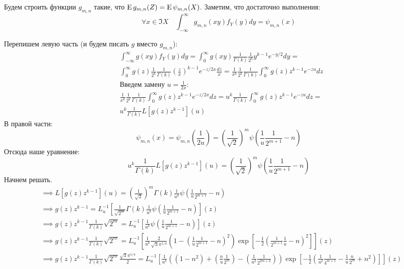 \documentclass[a4paper, fleqn]{report}
\begin{document}
Будем строить функции $g_{m,n}$ такие, что $\operatorname{E} g_{m,n}(Z) = \operatorname{E} \psi_{m,n}(X)$. Заметим, что достаточно выполнения:
\[
    \forall x \in \Im X \quad \int_{-\infty}^{\infty} g_{m,n}(xy)f_Y(y)dy = \psi_{m,n}(x) 
\]

Перепишем левую часть (и будем писать $g$ вместо $g_{m,n}$):
\begin{align*}
    & \int_{-\infty}^{\infty} g(xy) f_Y(y) dy = 
      \int_{0}^{\infty} g(xy) \frac{1}{\Gamma(k)} \frac{1}{2^k} y^{k-1} e^{-y/2} dy = \\
    & \int_{0}^{\infty} g(z) \frac{1}{2^k} \frac{1}{\Gamma(k)} \left( \frac{z}{x} \right)^{k-1} e^{-z / 2x} \frac{dz}{x} =
      \frac{1}{x^k} \frac{1}{2^k} \frac{1}{\Gamma(k)} \int_{0}^{\infty} g(z) z^{k-1} e^{-zu} dz \\
    & \text{Введем замену $u = \frac{1}{2x}$: }\\
    & \frac{1}{x^k} \frac{1}{2^k} \frac{1}{\Gamma(k)} \int_{0}^{\infty} g(z) z^{k-1} e^{-z / 2x} dz =
      u^k \frac{1}{\Gamma(k)} \int_{0}^{\infty} g(z) z^{k-1} e^{-zu} dz = \\
    & u^k \frac{1}{\Gamma(k)} L\left[ g(z)z^{k-1} \right](u) 
\end{align*}
В правой части:
\[
    \psi_{m,n}(x) =
    \psi_{m,n}\left( \frac{1}{2u} \right) =
    \left( \frac{1}{\sqrt{2} } \right)^m \psi\left(\frac{1}{u} \frac{1}{2^{m+1}} - n\right)
\] 
Отсюда наше уравнение:
\[
    u^k \frac{1}{\Gamma(k)} L\left[ g(z)z^{k-1} \right](u) = 
    \left(\frac{1}{\sqrt{2}}\right)^m \psi\left(\frac{1}{u} \frac{1}{2^{m+1}}-n\right)
\] 
Начнем решать.
\begin{align*}
    & \implies L\left[ g(z) z^{k-1} \right](u) = \left( \frac{1}{\sqrt{2} } \right)^m \Gamma(k) \frac{1}{u^k} \psi \left( \frac{1}{u} \frac{1}{2^{m+1}} - n \right) \\
    & \implies g(z) z^{k-1} = L^{-1}_u \left[ \frac{1}{\sqrt{2^m} } \Gamma(k) \frac{1}{u^k} \psi \left( \frac{1}{u} \frac{1}{2^{m+1}} - n \right)  \right] (z) \\
    & \implies g(z) z^{k-1} \frac{1}{\Gamma(k)} \sqrt{2^m} = L^{-1}_u \left[ \frac{1}{u^k} \psi \left( \frac{1}{u} \frac{1}{2^{m+1}} - n \right) \right] (z) \\
    & \implies g(z) z^{k-1} \frac{1}{\Gamma(k)} \sqrt{2^m} = L^{-1}_u \left[ \frac{1}{u^k} \frac{2}{\sqrt{3} \pi^{1 /4}} \left( 1 - \left( \frac{1}{u} \frac{1}{2^{m+1}} - n \right)^2  \right) \exp \left[ -\frac{1}{2} \left( \frac{1}{2^{m+1}} \frac{1}{u} - n \right)^2  \right]   \right](z) \\
    & \implies g(z) z^{k-1} \frac{1}{\Gamma(k)} \sqrt{2^m} \frac{\sqrt{3} \pi^{1 /4}}{2} = L^{-1}_u \left[ \frac{1}{u^k} \left( \left( 1 - n^2 \right)  + \left( \frac{n}{u} \frac{1}{2^{m}}\right) - \left( \frac{1}{u^2} \frac{1}{2^{2m+2}} \right) \right) \exp \left[ -\frac{1}{2} \left( \frac{1}{u^2} \frac{1}{4^{m+1}} -  \frac{1}{u} \frac{n}{2^m} + n^2 \right)  \right]   \right](z) \\
\end{align*}
\end{document}
